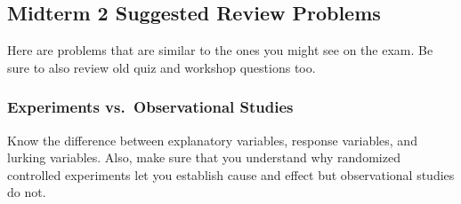 \documentclass[12pt]{exam}
\begin{document}
\subsection*{Midterm 2 Suggested Review Problems} 

Here are problems that are similar to the ones you might see on the
exam. Be sure to also review old quiz and workshop questions too.

\subsubsection*{Experiments vs.~Observational
Studies}\label{experiments-vs.-observational-studies}

Know the difference between explanatory variables, response variables,
and lurking variables. Also, make sure that you understand why
randomized controlled experiments let you establish cause and effect but
observational studies do not.
\end{document}
